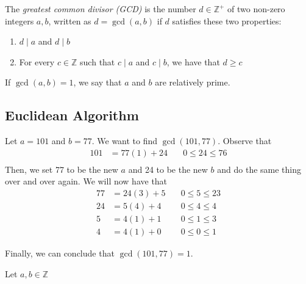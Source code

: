 \begin{definition}
    The \textit{greatest common divisor (GCD)} is the number \(d \in \mathbb{Z}^+\) of two non-zero integers \(a, b\), written as \(d = \gcd(a, b)\) if \(d\) satisfies these two properties:
    \begin{enumerate}
        \item \(d \mid a\) and \(d \mid b\)
        \item For every \(c \in \mathbb{Z}\) such that \(c \mid a\) and \(c \mid b\), we have that \(d \geq c\)
    \end{enumerate}
\end{definition}

\begin{definition}
    If \(\gcd(a, b) = 1\), we say that \(a\) and \(b\) are relatively prime.
\end{definition}

\subsection{Euclidean Algorithm}

\begin{nexample}
    Let \(a = 101\) and \(b = 77\). We want to find \(\gcd(101, 77)\). Observe that 
    \[
    \begin{aligned}
        101 &= 77(1) + 24 &\quad 0 \leq 24 \leq 76 \\
    \end{aligned}
    \]
    Then, we set 77 to be the new \(a\) and 24 to be the new \(b\) and do the same thing over and over again. We will now have that
    \[
    \begin{aligned}
        77 &= 24(3) + 5 &\quad 0 \leq 5 \leq 23 \\
        24 &= 5(4) + 4 &\quad 0 \leq 4 \leq 4 \\
        5 &= 4(1) + 1 &\quad 0 \leq 1 \leq 3 \\
        4 &= 4(1) + 0 &\quad 0 \leq 0 \leq 1
    \end{aligned}
    \]

    Finally, we can conclude that \(\gcd(101, 77) = 1\).
\end{nexample}

\begin{theorem}
    Let \(a, b \in \mathbb{Z}\)
\end{theorem}
